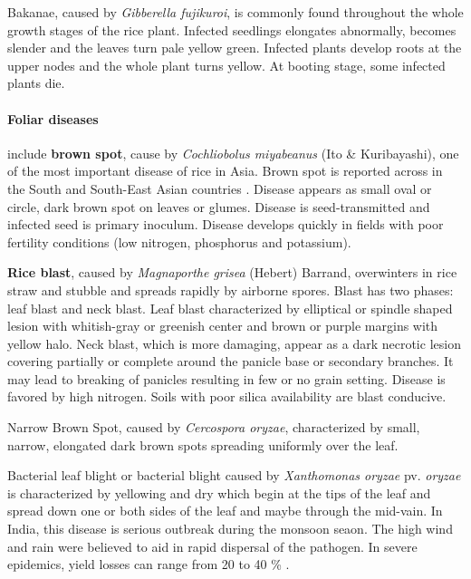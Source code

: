 Bakanae, caused by \textit{Gibberella fujikuroi}, is commonly found throughout the whole growth stages of the rice plant. Infected seedlings elongates abnormally, becomes slender and the leaves turn pale yellow green. Infected plants develop roots at the upper nodes and the whole plant turns yellow. At booting stage, some infected plants die. 

\paragraph{Foliar diseases} include \textbf{brown spot}, cause by \textit{Cochliobolus miyabeanus} (Ito \& Kuribayashi), one of the most important disease of rice in Asia. Brown spot is reported across in the South and South-East Asian countries \citep{barnwal2013review}. Disease appears as small oval or circle, dark brown spot on leaves or glumes. Disease is seed-transmitted and infected seed is primary inoculum. Disease develops quickly in fields with poor fertility conditions (low nitrogen, phosphorus and potassium). 

\textbf{Rice blast}, caused by \textit{Magnaporthe grisea} (Hebert) Barrand, overwinters in rice straw and stubble and spreads rapidly by airborne spores. Blast has two phases: leaf blast and neck blast. Leaf blast characterized by elliptical or spindle shaped lesion with whitish-gray or greenish center and brown or purple margins with yellow halo. Neck blast, which is more damaging, appear as a dark necrotic lesion covering partially or complete around the panicle base or secondary branches. It may lead to breaking of panicles resulting in few or no grain setting. Disease is favored by high nitrogen. Soils with poor silica availability are blast conducive. 

Narrow Brown Spot, caused by \textit{Cercospora oryzae}, characterized by small, narrow, elongated dark brown spots spreading uniformly over the leaf. 

Bacterial leaf blight or bacterial blight caused by \textit{Xanthomonas oryzae} pv. \textit{oryzae} is characterized by yellowing and dry which  begin at the tips of the leaf and spread down one or both sides of the leaf and maybe through the mid-vain. In India, this disease is serious outbreak during the monsoon seaon. The high wind and rain were believed to aid in rapid dispersal of the pathogen. In severe epidemics, yield losses can range from 20 to 40 \% \citep{sonti1998bacterial}.

